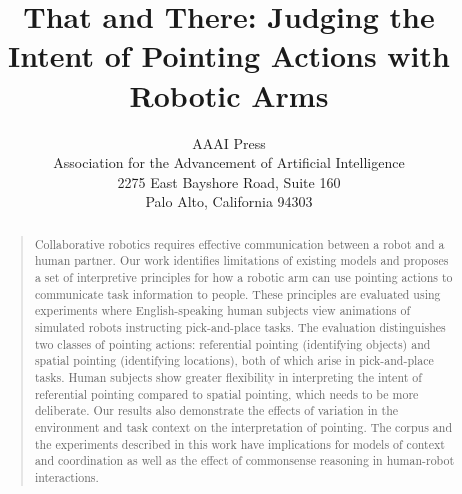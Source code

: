 \documentclass[letterpaper]{article}
\begin{document}
%
\title{That and There: Judging the Intent of Pointing Actions with Robotic Arms}


\author{AAAI Press\\
Association for the Advancement of Artificial Intelligence\\
2275 East Bayshore Road, Suite 160\\
Palo Alto, California 94303\\
}
\maketitle
\begin{abstract}
\begin{quote}

Collaborative robotics requires effective communication between a robot and a human partner. Our work identifies limitations of existing models and proposes a set of interpretive principles for how a robotic arm can use pointing actions to communicate task information to people. These principles are evaluated using experiments where English-speaking human subjects view animations of simulated robots instructing pick-and-place tasks. The evaluation distinguishes two classes of pointing actions: referential pointing (identifying objects) and spatial pointing (identifying locations), both of which arise in pick-and-place tasks. Human subjects show greater flexibility in interpreting the intent of referential pointing compared to spatial pointing, which needs to be more deliberate. Our results also demonstrate the effects of variation in the environment and task context on the interpretation of pointing. The corpus and the experiments described in this work have implications for models of context and coordination as well as the effect of commonsense reasoning in human-robot interactions.








\end{quote}
\end{abstract}
\end{document}
